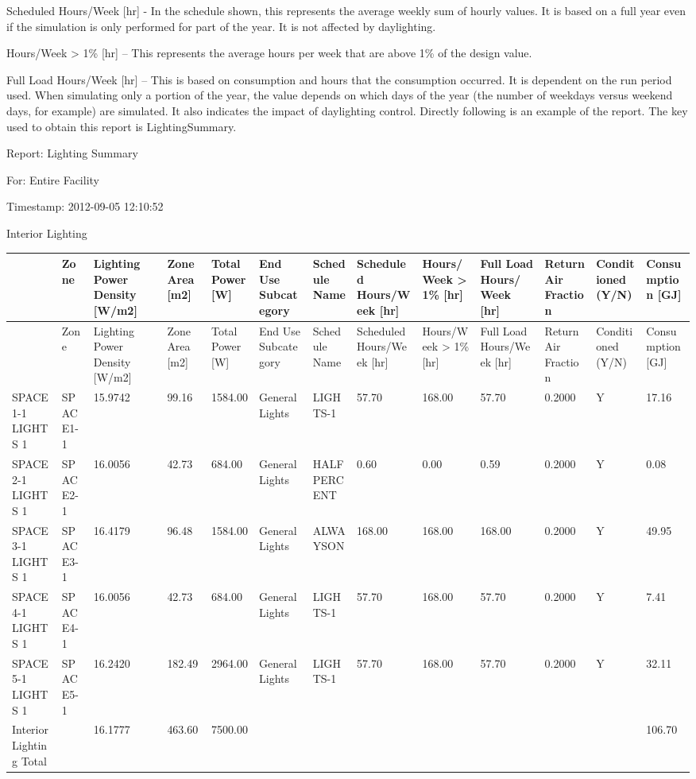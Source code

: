 Scheduled Hours/Week {[}hr{]} - In the schedule shown, this represents the average weekly sum of hourly values. It is based on a full year even if the simulation is only performed for part of the year. It is not affected by daylighting.

Hours/Week \textgreater{} 1\% {[}hr{]} -- This represents the average hours per week that are above 1\% of the design value.

Full Load Hours/Week {[}hr{]} -- This is based on consumption and hours that the consumption occurred. It is dependent on the run period used. When simulating only a portion of the year, the value depends on which days of the year (the number of weekdays versus weekend days, for example) are simulated. It also indicates the impact of daylighting control. Directly following is an example of the report. The key used to obtain this report is LightingSummary.

Report: Lighting Summary

For: Entire Facility

Timestamp: 2012-09-05 12:10:52

Interior Lighting

{\scriptsize
\begin{longtable}[c]{>{\raggedright}p{0.46in}>{\raggedright}p{0.46in}>{\raggedright}p{0.46in}>{\raggedright}p{0.46in}>{\raggedright}p{0.46in}>{\raggedright}p{0.46in}>{\raggedright}p{0.46in}>{\raggedright}p{0.46in}>{\raggedright}p{0.46in}>{\raggedright}p{0.46in}>{\raggedright}p{0.46in}>{\raggedright}p{0.46in}>{\raggedright}p{0.46in}}
\toprule 
 & Zone & Lighting Power Density [W/m2] & Zone Area [m2] & Total Power [W] & End Use Subcategory & Schedule Name & Scheduled Hours/Week [hr] & Hours/Week  >  1\% [hr] & Full Load Hours/Week [hr] & Return Air Fraction & Conditioned (Y/N) & Consumption [GJ] \tabularnewline
\midrule
\endfirsthead

\toprule 
 & Zone & Lighting Power Density [W/m2] & Zone Area [m2] & Total Power [W] & End Use Subcategory & Schedule Name & Scheduled Hours/Week [hr] & Hours/Week  >  1\% [hr] & Full Load Hours/Week [hr] & Return Air Fraction & Conditioned (Y/N) & Consumption [GJ] \tabularnewline
\midrule
\endhead

SPACE1-1 LIGHTS 1 & SPACE1-1 & 15.9742 & 99.16 & 1584.00 & GeneralLights & LIGHTS-1 & 57.70 & 168.00 & 57.70 & 0.2000 & Y & 17.16 \tabularnewline
SPACE2-1 LIGHTS 1 & SPACE2-1 & 16.0056 & 42.73 & 684.00 & GeneralLights & HALFPERCENT & 0.60 & 0.00 & 0.59 & 0.2000 & Y & 0.08 \tabularnewline
SPACE3-1 LIGHTS 1 & SPACE3-1 & 16.4179 & 96.48 & 1584.00 & GeneralLights & ALWAYSON & 168.00 & 168.00 & 168.00 & 0.2000 & Y & 49.95 \tabularnewline
SPACE4-1 LIGHTS 1 & SPACE4-1 & 16.0056 & 42.73 & 684.00 & GeneralLights & LIGHTS-1 & 57.70 & 168.00 & 57.70 & 0.2000 & Y & 7.41 \tabularnewline
SPACE5-1 LIGHTS 1 & SPACE5-1 & 16.2420 & 182.49 & 2964.00 & GeneralLights & LIGHTS-1 & 57.70 & 168.00 & 57.70 & 0.2000 & Y & 32.11 \tabularnewline
Interior Lighting Total & ~ & 16.1777 & 463.60 & 7500.00 & ~ & ~ & ~ & ~ & ~ & ~ & ~ & 106.70 \tabularnewline
\bottomrule
\end{longtable}}

